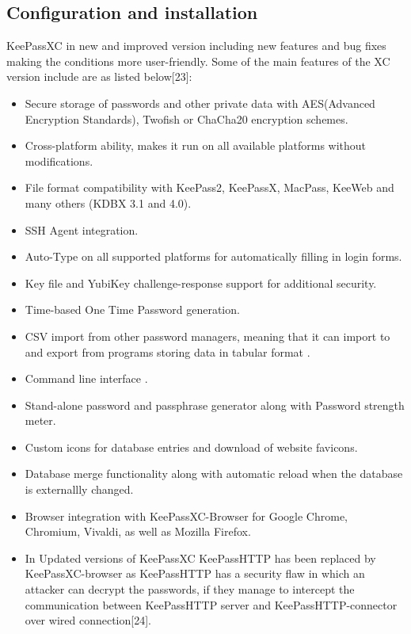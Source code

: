 \documentclass[12pt]{article}
\begin{document}
\subsection{Configuration and installation}
KeePassXC in new and improved version including new features and bug fixes making the conditions more user-friendly. Some of the main features of the XC version include are as listed below[23]:

\begin{itemize}

   
    \item Secure storage of passwords and other private data with AES(Advanced Encryption Standards), Twofish or ChaCha20 encryption schemes. 
    \item Cross-platform ability, makes it run on all available platforms without modifications. 
    \item File format compatibility with KeePass2, KeePassX, MacPass, KeeWeb and many others (KDBX 3.1 and 4.0).
    \item SSH Agent integration. 
    \item Auto-Type on all supported platforms for automatically filling in login forms. 
    \item Key file and YubiKey challenge-response support for additional security. 
    \item Time-based One Time Password  generation. 
    \item CSV import from other password managers, meaning that it can import to and export from programs storing data in tabular format . 
    \item Command line interface .
    \item Stand-alone password and passphrase generator along with Password strength meter.
    \item Custom icons for database entries and download of website favicons. 
    \item Database merge functionality along with automatic reload when the database is externallly changed.
    \item Browser integration with KeePassXC-Browser for Google Chrome, Chromium, Vivaldi, as well as  Mozilla Firefox. 
    \item In Updated versions of KeePassXC KeePassHTTP has been replaced by KeePassXC-browser as KeePassHTTP has a security flaw in which an attacker can decrypt the passwords, if they manage to intercept the communication between KeePassHTTP server and KeePassHTTP-connector over wired connection[24].
\end{itemize}
\end{document}
